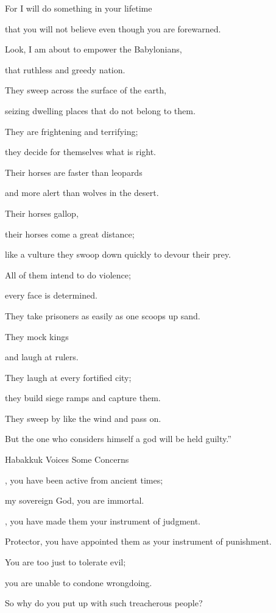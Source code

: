 {\par }{\Q For
I will do
something
in your lifetime
\par }{\Q that you will not
believe
even though
you are forewarned.
\par }{\Q {}Look,
I am about to empower
the Babylonians,
\par }{\Q that ruthless
and greedy
nation.
\par }{\Q They sweep across
the surface
of the earth,
\par }{\Q seizing
dwelling places
that do not belong to them.
\par }{\Q {}They are frightening
and terrifying;
\par }{\Q they
decide
for themselves what is right.
\par }{\Q {}Their horses
are faster
than leopards
\par }{\Q and more alert
than wolves
in the desert.
\par }{\Q Their horses
gallop,
\par }{\Q their horses
come
a great distance;
\par }{\Q like a vulture
they swoop down
quickly
to devour their prey.
\par }{\Q {}All
of them intend to do
violence;
\par }{\Q every face
is determined.
\par }{\Q They take
prisoners
as easily as one scoops up
sand.
\par }{\Q {}They mock
kings
\par }{\Q and laugh
at rulers.
\par }{\Q They laugh at every
fortified
city;
\par }{\Q they build siege ramps
and capture them.
\par }{\Q {}They sweep
by like the wind
and pass on.
\par }{\Q But the one who
considers himself a god
will be held guilty.”
\par }{\SH Habakkuk Voices Some Concerns
\par }{\Q {}, you
have been active from ancient times;
\par }{\Q my sovereign
God,
you are immortal.
\par }{, you have made them your instrument of judgment.
\par }{\Q Protector,
you have appointed
them as your instrument
of punishment.
\par }{\Q {}You are too just
to tolerate
evil;
\par }{\Q you are unable
to
condone
wrongdoing.
\par }{\Q So why
do you put up
with such treacherous people?

}
